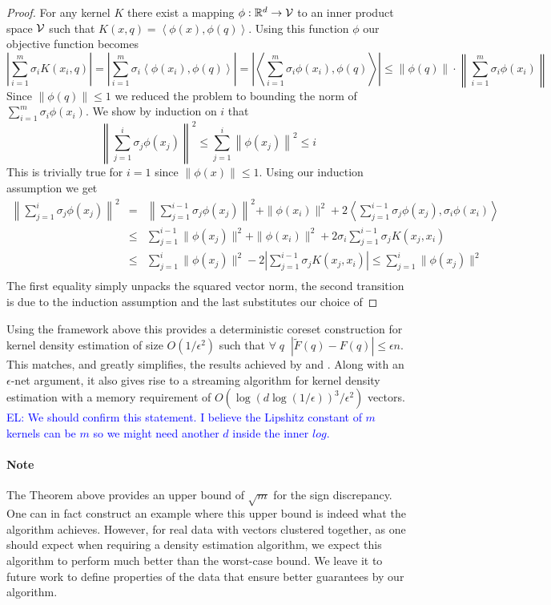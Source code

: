 \documentclass[anon,12pt]{colt2019} %
\newcommand{\el}[1]{\textcolor{blue}{EL: #1}}
\newcommand{\ip}[1]{\left \langle #1 \right \rangle}
\newcommand{\R}{\mathbb{R}}
\newcommand{\eps}{\epsilon}
\begin{document}
\begin{proof}
For any kernel $K$ there exist a mapping $\phi: \R^d \to {\cal V}$ to an inner product space $\cal V$ such that 
$ K(x,q) = \ip{\phi(x), \phi(q)} $.
Using this function $\phi$ our objective function becomes
\[
|\sum_{i=1}^m \sigma_i K(x_i,q)| = |\sum_{i=1}^m \sigma_i \ip{\phi(x_i), \phi(q)} | = \left| \ip{ \sum_{i=1}^m \sigma_i \phi(x_i), \phi(q)}\right| \leq  \|\phi(q)\| \cdot \left\|  \sum_{i=1}^m \sigma_i \phi(x_i) \right\| 
\]
Since $\|\phi(q)\| \leq 1$ we reduced the problem to bounding the norm of $ \sum_{i=1}^m \sigma_i \phi(x_i) $.
%
We show by induction on $i$ that 
$$\left\| \sum_{j=1}^i \sigma_j \phi(x_j) \right\|^2 \le \sum_{j=1}^i \left\|\phi(x_j)\right\|^2 \leq i$$
This is trivially true for $i=1$ since $\|\phi(x)\| \leq 1$. 
Using our induction assumption we get
\begin{eqnarray*}
\left\| \sum_{j=1}^{i}\sigma_j \phi(x_j)\right\|^2 &=& \left\|\sum_{j=1}^{i-1}\sigma_j \phi(x_j)\right\|^2 + \|\phi(x_i)\|^2 + 2\ip{ \sum_{j=1}^{i-1}\sigma_j \phi(x_j), \sigma_i \phi(x_i)} \\
&\le& \sum_{j=1}^{i-1} \|\phi(x_j)\|^2 + \|\phi(x_i)\|^2 + 2\sigma_i \sum_{j=1}^{i-1}\sigma_j K(x_j, x_i)\\
&\le& \sum_{j=1}^{i} \|\phi(x_j)\|^2 - 2|\sum_{j=1}^{i-1}\sigma_j K(x_j, x_i)| \le \sum_{j=1}^{i} \|\phi(x_j)\|^2 \\
\end{eqnarray*}
The first equality simply unpacks the squared vector norm, the second transition is due to the induction assumption and the last substitutes our choice of %
\end{proof}

Using the framework above this provides a deterministic coreset construction for kernel density estimation of size $O(1/\eps^2)$ such that $\forall \;q\;\; |\tilde F(q) - F(q)| \le \eps n$. This matches, and greatly simplifies, the results achieved by \cite{DBLP:conf/soda/PhillipsT18} and \cite{DBLP:journals/corr/abs-1802-01751}. Along with an $\eps$-net argument, it also gives rise to a streaming algorithm for kernel density estimation with a memory requirement of $O\left(\log\left(d\log(1/\eps)\right)^3/\eps^2\right)$ vectors.
\el{We should confirm this statement. I believe the Lipshitz constant of $m$ kernels can be $m$ so we might need another $d$ inside the inner $log$.}

\paragraph{Note} The Theorem above provides an upper bound of $\sqrt{m}$ for the sign discrepancy. One can in fact construct an example where this upper bound is indeed what the algorithm achieves. However, for real data with vectors clustered together, as one should expect when requiring a density estimation algorithm, we expect this algorithm to perform much better than the worst-case bound. We leave it to future work to define properties of the data that ensure better guarantees by our algorithm.
\end{document}

